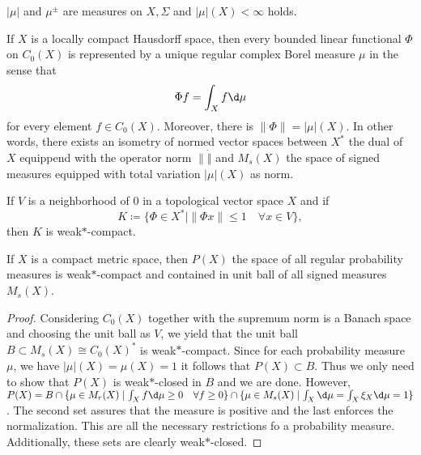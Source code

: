 \begin{prop}
  \(|\mu|\) and \(\mu^\pm\) are measures on \(X, \Sigma\) and \(|\mu|(X) < \infty\) holds.
\end{prop}

\begin{thm}
  If \(X\) is a locally compact Hausdorff space, then every bounded linear functional \(\Phi\) on \(C_0(X)\) is represented by a unique regular complex Borel measure \(\mu\) in the sense that \[
    \Phi f = \int_X f \d\mu
  \]
  for every element \(f \in C_0(X)\). Moreover, there is \(\|\Phi\| = |\mu|(X)\). In other words, there exists an isometry of normed vector spaces between \(X^\ast\) the dual of \(X\) equippend with the operator norm \(\|\dot \|\) and \(M_{s}(X)\) the space of signed measures equipped with total variation \(|\mu|(X)\) as norm.
\end{thm}

\begin{thm}
  If \(V\) is a neighborhood of 0 in a topological vector space \(X\) and if
  \[
    K \coloneqq \{ \Phi \in X^\ast \mid \|\Phi x\| \leq 1 \quad \forall x \in V\},
  \]
  then \(K\) is weak\(\ast\)-compact.
\end{thm}

\begin{cor}
  \label{cor:banach-alaoglu}
  If \(X\) is a compact metric space, then \(P(X)\) the space of all regular probability measures is weak\(\ast\)-compact and contained in unit ball of all signed measures \(M_{s}(X)\).
\end{cor}

\begin{proof}
  Considering \(C_0(X)\) together with the supremum norm is a Banach space and choosing the unit ball as \(V\), we yield that the unit ball \(B \subset M_s(X) \cong C_0(X)^\ast\) is weak\(\ast\)-compact. Since for each probability measure \(\mu\), we have \(|\mu|(X) = \mu(X) = 1\) it follows that \(P(X) \subset B\). Thus we only need to show that \(P(X)\) is weak\(\ast\)-closed in \(B\) and we are done. However, \(P(X) = B \cap \{\mu \in M_r(X) \mid \int_X f \d\mu \geq 0 \quad \forall f \geq 0\} \cap \{\mu \in M_s(X) \mid \int_X \d\mu = \int_X \xi_X \d\mu = 1\}\). The second set assures that the measure is positive and the last enforces the normalization. This are all the necessary restrictions fo a probability measure. Additionally, these sets are clearly weak\(\ast\)-closed.
\end{proof}

